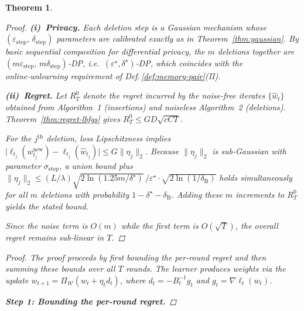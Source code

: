 \documentclass[a4paper,12pt]{article}
\newtheorem{theorem}{Theorem}
\begin{document}
\begin{theorem}
\begin{proof}
\textbf{(i) Privacy.}
Each deletion step is a Gaussian mechanism whose $(\varepsilon_{\text{step}},\,
\delta_{\text{step}})$ parameters are calibrated exactly as in
Theorem~\ref{thm:gaussian}.  
By basic sequential composition for differential privacy,
the $m$ deletions together are
$(m\varepsilon_{\text{step}},\,m\delta_{\text{step}})$‑DP, i.e.\
$(\varepsilon^\star,\delta^\star)$‑DP, which coincides with the
online‑unlearning requirement of Def.\,\ref{def:memory-pair}(II).

\medskip
\noindent
\textbf{(ii) Regret.}
Let $R_{T}^{0}$ denote the regret incurred by the noise‑free iterates
$\{\hat w_{t}\}$ obtained from Algorithm 1 (insertions) and noiseless
Algorithm 2 (deletions).
Theorem~\ref{thm:regret-lbfgs} gives
$R_{T}^{0} \le GD\sqrt{cCT}$.

For the $j^{\text{th}}$ deletion, loss Lipschitzness implies  
$\bigl|\ell_{t_j}(w_{t_j}^{\text{new}})-\ell_{t_j}(\hat w_{t_j})\bigr|
      \le G\lVert\eta_j\rVert_2$.
Because $\lVert\eta_j\rVert_2$ is sub‑Gaussian with parameter
$\sigma_{\text{step}}$, a union bound plus
$\|\eta_j\|_2 \le
  (L/\lambda)\sqrt{2\ln(1.25m/\delta^{\star})}\,/\varepsilon^{\star}
  \cdot\sqrt{2\ln(1/\delta_{\mathrm{B}})}$
holds simultaneously for all $m$ deletions
with probability $1-\delta^\star-\delta_{\mathrm{B}}$.
Adding these $m$ increments to $R_{T}^{0}$ yields the stated bound.

Since the noise term is $O(m)$ while the first term is
$O(\sqrt{T})$, the overall regret remains sub‑linear in $T$.
\end{proof}


\begin{proof}
The proof proceeds by first bounding the per-round regret and then summing these bounds over all $T$ rounds. The learner produces weights via the update $w_{t+1} = \Pi_{\mathcal{W}}(w_t + \eta_t d_t)$, where $d_t = -B_t^{-1}g_t$ and $g_t = \nabla\ell_t(w_t)$.

\textbf{Step 1: Bounding the per-round regret.}


\end{proof}
\end{theorem}
\end{document}
